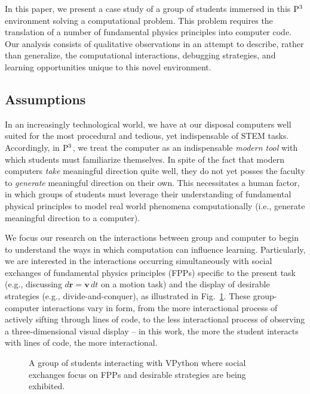 \documentclass{msuphddissertation}
\begin{document}
\begin{doublespace}
In this paper, we present a case study of a group of students immersed in this ${\rm P}^{3}$ environment solving a computational problem.  This problem requires the translation of a number of fundamental physics principles into computer code.  Our analysis consists of qualitative observations in an attempt to describe, rather than generalize, the computational interactions, debugging strategies, and learning opportunities unique to this novel environment.

\subsection{Assumptions}

In an increasingly technological world, we have at our disposal computers well suited for the most procedural and tedious, yet indispensable of STEM tasks.  Accordingly, in ${\rm P}^{3}$, we treat the computer as an indispensable \emph{modern tool} with which students must familiarize themselves.  In spite of the fact that modern computers \emph{take} meaningful direction quite well, they do not yet posses the faculty to \emph{generate} meaningful direction on their own.  This necessitates a human factor, in which groups of students must leverage their understanding of fundamental physical principles to model real world phenomena computationally (i.e., generate meaningful direction to a computer).

We focus our research on the interactions between group and computer to begin to understand the ways in which computation can influence learning.  Particularly, we are interested in the interactions occurring simultaneously with social exchanges of fundamental physics principles (FPPs) specific to the present task (e.g., discussing $d\mathbf{r}=\mathbf{v}\,dt$ on a motion task) and the display of desirable strategies (e.g., divide-and-conquer), as illustrated in Fig.~\ref{interactions}.  These group-computer interactions vary in form, from the more interactional process of actively sifting through lines of code, to the less interactional process of observing a three-dimensional visual display -- in this work, the more the student interacts with lines of code, the more interactional.

\begin{figure}
\caption{A group of students interacting with VPython where social exchanges focus on FPPs and desirable strategies are being exhibited.}
\label{interactions}
\end{figure}


\end{doublespace}
\end{document}
